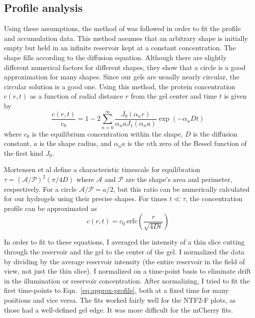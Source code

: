 \subsection{Profile analysis}
\label{sec:profile-analysis}
Using these assumptions, the method of \cite{mortensen06} was followed in order to fit the profile and accumulation data.  This method assumes that an arbitrary shape is initially empty but held in an infinite reservoir kept at a constant concentration.  The shape fills according to the diffusion equation.  Although there are slightly different numerical factors for different shapes, they show that a circle is a good approximation for many shapes.  Since our gels are usually nearly circular, the circular solution is a good one.  Using this method, the protein concentration $c(r,t)$ as a function of radial distance $r$ from the gel center and time $t$ is given by
\begin{equation}
\frac{c(r,t)}{c_0} = 1 - 2\sum_{n=0}^\infty \frac{J_0(\alpha_n r)}{\alpha_n a J_1(\alpha_n a)}\exp(-\alpha_n D t)
\label{eq:full-profile}
\end{equation}
where $c_0$ is the equilibrium concentration within the shape, $D$ is the diffusion constant, $a$ is the shape radius, and $\alpha_n a$ is the $n$th zero of the Bessel function of the first kind $J_0$.

Mortensen et al define a characteristic timescale for equilibration $\tau = (\mathcal{A}/\mathcal{P})^2 (\pi/4D)$ where $\mathcal{A}$ and $\mathcal{P}$ are the shape's area and perimeter, respectively.  For a circle $\mathcal{A}/\mathcal{P} = a/2$, but this ratio can be numerically calculated for our hydrogels using their precise shapes.  For times $t \ll \tau$, the concentration profile can be approximated as 
\begin{equation}
c(r,t) = c_0 \,\mathrm{erfc}\left(\frac{r}{\sqrt{4Dt}}\right)
\label{eq:approx-profile}
\end{equation}

In order to fit to these equations, I averaged the intensity of a thin slice cutting through the reservoir and the gel to the center of the gel.  I normalized the data by dividing by the average reservoir intensity (the entire reservoir in the field of view, not just the thin slice).  I normalized on a time-point basis to eliminate drift in the illumination or reservoir concentration.  After normalizing, I tried to fit the first time-points to Eqn.~\ref{eq:approx-profile}, both at a fixed time for many positions and vice versa.  The fits worked fairly well for the NTF2-F plots, as those had a well-defined gel edge.  It was more difficult for the mCherry fits.

